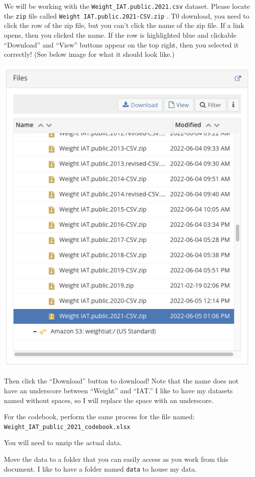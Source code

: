 \documentclass[
  letterpaper,
  DIV=11,
  numbers=noendperiod]{scrartcl}
\begin{document}
We will be working with the \texttt{Weight\_IAT.public.2021.csv}
dataset. Please locate the \texttt{zip} file called
\texttt{Weight\ IAT.public.2021-CSV.zip} . T0 download, you need to
click the row of the zip file, but you can't click the name of the zip
file. If a link opens, then you clicked the name. If the row is
highlighted blue and clickable ``Download'' and ``View'' buttons appear
on the top right, then you selected it correctly! (See below image for
what it should look like.)

\includegraphics{images/data_access_3.png}

Then click the ``Download'' button to download! Note that the name does
not have an underscore between ``Weight'' and ``IAT.'' I like to have my
datasets named without spaces, so I will replace the space with an
underscore.

For the codebook, perform the same process for the file named:
\texttt{Weight\_IAT\_public\_2021\_codebook.xlsx}

You will need to unzip the actual data.

Move the data to a folder that you can easily access as you work from
this document. I like to have a folder named \texttt{data} to house my
data.
\end{document}
